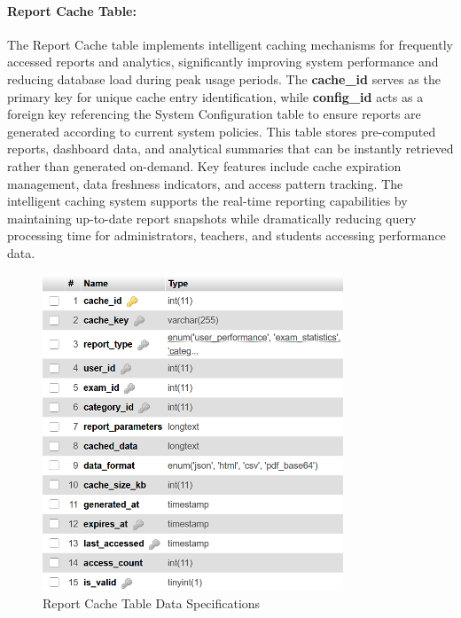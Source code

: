 \documentclass[12pt,a4paper,oneside]{book}
\begin{document}
\clearpage
\paragraph{Report Cache Table:}
The Report Cache table implements intelligent caching mechanisms for frequently accessed reports and analytics, significantly improving system performance and reducing database load during peak usage periods. The \textbf{cache\_id} serves as the primary key for unique cache entry identification, while \textbf{config\_id} acts as a foreign key referencing the System Configuration table to ensure reports are generated according to current system policies. This table stores pre-computed reports, dashboard data, and analytical summaries that can be instantly retrieved rather than generated on-demand. Key features include cache expiration management, data freshness indicators, and access pattern tracking. The intelligent caching system supports the real-time reporting capabilities by maintaining up-to-date report snapshots while dramatically reducing query processing time for administrators, teachers, and students accessing performance data.

\begin{figure}[H]
\centering
\includegraphics[width=0.8\textwidth]{assets/DBTable/Table4.12.png}
\caption{Report Cache Table Data Specifications}
\label{table:report_cache}
\end{figure}

\clearpage
\end{document}
